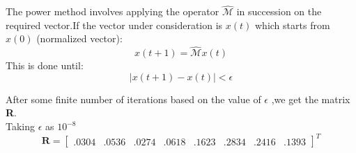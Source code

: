 \documentclass{beamer}
\begin{document}
\begin{frame}
The power method involves applying the operator $\widehat{\mathcal{M}}$ in succession on the required vector.If the vector under consideration is $x(t)$ which starts from $x(0)$ (normalized vector):
\[
x(t+1)=\widehat{\mathcal{M}}x(t)
\]
This is done until:
\[
|x(t+1)-x(t)| < \epsilon
\]

After some finite number of iterations based on the value of $\epsilon$ ,we get the matrix \textbf{R}.\\
\vspace{1em}
Taking $\epsilon$ as $10^{-8}$ 
\[
\textbf{R}=
\begin{bmatrix}
.0304 & .0536& .0274 & .0618& .1623& .2834& .2416&.1393
\end{bmatrix}^T
\]
\end{frame}

\end{document}
